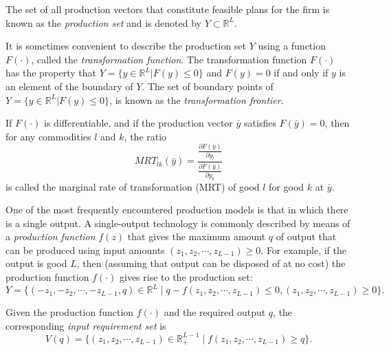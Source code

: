 \documentclass[12pt,fleqn]{book} %
\begin{document}
\begin{definition}
	The set of all production vectors that constitute feasible plans for the firm is known as the \emph{production set} and is denoted
	by $Y\subset \mathbb{R}^L$.
\end{definition}


\begin{definition}
It is somctimes convenient to describe the production set $Y$ using a function $F(\cdot)$, called the \emph{transformation function}. The transformation function $F(\cdot)$ has the property
that $Y = \{y\in\mathbb{R}^L|F(y)\le 0\} $ and $F(y) = 0$ if and only if $y$ is an element of the boundary of $Y$. The set of boundary points of $Y = \{y\in\mathbb{R}^L|F(y)\le 0\}$, is known as the \emph{transformation frontier}.
\end{definition}

	
\begin{definition}
	If $F(\cdot)$ is differentiable, and if the production vector $\bar{y}$ satisfies $F(\bar{y}) = 0$, then for any commodities $l$ and $k$, the ratio 
	\[
	MRT_{lk}(\bar{y})=\frac{\frac{\partial F(\bar{y})}{\partial y_l}}{\frac{\partial F(\bar{y})}{\partial y_k}}
	\]
	is called the marginal rate of transformation (MRT) of good $l$ for good $k$ at $\bar{y}$.
\end{definition}	
	
\begin{definition}
	One of the most frequently encountered production models is that in which there	is a single output. A single-output technology is commonly described by means of a \emph{production function} $f(z)$ that gives the maximum amount $q$ of output that can be
	produced using input amounts $(z_1,z_2,\cdots,z_{L-1})\ge0$. For example, if the output is good $L$, then (assuming that output can be disposed of at no cost) the production function
	$f(\cdot)$ gives rise to the production set:
	\[
	Y = \{(-z_1,-z_2,\cdots,-z_{L-1},q)\in\mathbb{R}^L\;|\;q-f(z_1,z_2,\cdots,z_{L-1})\le0,(z_1,z_2,\cdots,z_{L-1})\ge0\}.
	\]
	
\end{definition}

\begin{definition}
Given the production function $f(\cdot)$ and the required output $q$, the corresponding \emph{input requirement set} is
	\[
	V(q) = \{(z_1,z_2,\cdots,z_{L-1})\in\mathbb{R}_+^{L-1}\;|\;f(z_1,z_2,\cdots,z_{L-1})\ge q\}.
	\]
	
\end{definition}	
	
\end{document}
